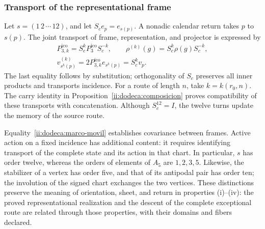 \subsubsection{Transport of the representational frame}
\label{ii:dodeca:marco}
Let \(s=(1\,2\,\cdots\,12)\), and let \(S_ce_p=e_{s(p)}\).
A nonadic calendar return takes \(p\) to \(s(p)\). The joint
transport of frame, representation, and projector is expressed by
\begin{equation}
 \begin{gathered}
 P_{3,k}^{\mathrm{ico}}=S_c^kP_3^{\mathrm{ico}}S_c^{-k},\qquad
 \rho^{(k)}(g)=S_c^k\rho(g)S_c^{-k},\\
 v^{(k)}_{s^k(p)}=2P_{3,k}^{\mathrm{ico}}e_{s^k(p)}=S_c^kv_p.
 \end{gathered}
 \label{ii:dodeca:marco-movil}
\end{equation}
The last equality follows by substitution; orthogonality of
\(S_c\) preserves all inner products and transports
incidence. For a route of length \(n\), take
\(k=k(r_0,n)\). The carry identity in
Proposition~\ref{ii:dodeca:composicion} proves compatibility of
these transports with concatenation. Although \(S_c^{12}=I\),
the twelve turns update the memory of the source route.

Equality~\eqref{ii:dodeca:marco-movil} establishes covariance between
frames. Active action on a fixed incidence has additional content:
it requires identifying transport of the complete state and its
action in that chart. In particular, \(s\) has order twelve, whereas
the orders of elements of \(A_5\) are \(1,2,3,5\).
Likewise, the stabilizer of a vertex has order five, and that of its
antipodal pair has order ten; the involution of the signed chart
exchanges the two vertices. These distinctions preserve the meaning
of orientation, sheet, and return in properties (i)--(iv): the
proved representational realization and the descent of the complete exceptional
route are related through those properties, with their
domains and fibers declared.

